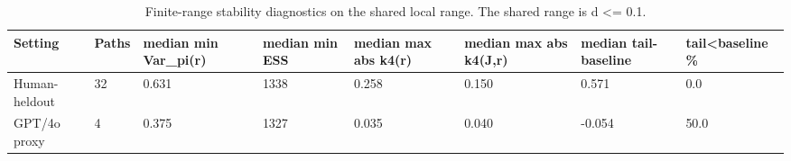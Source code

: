 \begin{table}[t]
\centering
\small
\begin{tabular}{llllllll}
\toprule
Setting & Paths & median min Var\_pi(r) & median min ESS & median max abs k4(r) & median max abs k4(J,r) & median tail-baseline & tail<baseline \% \\
\midrule
Human-heldout & 32 & 0.631 & 1338 & 0.258 & 0.150 & 0.571 & 0.0 \\
GPT/4o proxy & 4 & 0.375 & 1327 & 0.035 & 0.040 & -0.054 & 50.0 \\
\bottomrule
\end{tabular}
\vspace{0.25em}
\caption{Finite-range stability diagnostics on the shared local range. The shared range is d <= 0.1.}
\label{tab:finite-range-stability}
\end{table}
